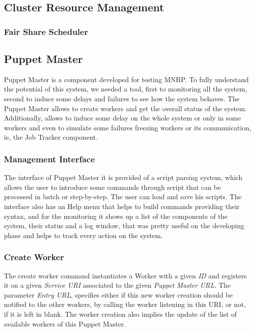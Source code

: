 \documentclass[times, 10pt,twocolumn]{article}
\begin{document}
    	\subsection{Cluster Resource Management}

            \subsubsection{Fair Share Scheduler}

    	\subsection{Puppet Master}
	      Puppet Master is a component developed for testing \ac{MNRP}. To fully understand the potential of this system, we needed a tool, first to monitoring all the system, second to induce some delays and failures to see how the system behaves. The Puppet Master allows to create workers and get the overall status of the system. Additionally, allows to induce some delay on the whole system or only in some workers and even to simulate some failures freezing workers or its communication, ie, the Job Tracker component.
            \subsubsection{Management Interface}
            The interface of Puppet Master it is provided of a script parsing system, which allows the user to introduce some commands through script that can be processed in batch or step-by-step. The user can load and save his scripts. The interface also has an Help menu that helps to build commands providing their syntax, and for the monitoring it shows up a list of the components of the system, their status and a log window, that was pretty useful on the developing phase and helps to track every action on the system.
            \subsubsection{Create Worker}
            The create worker command instantiates a Worker with a given \emph{ID}
            and registers it on a given \emph{Service URI} associated to the given \emph{Puppet Master URL}.
            The parameter \emph{Entry URL}, specifies either if this new worker creation should be
            notified to the other workers, by calling the worker listening in this URI, or not, if it is left in blank.
            The worker creation also implies the update of the list of available workers of this Puppet Master.
\end{document}
